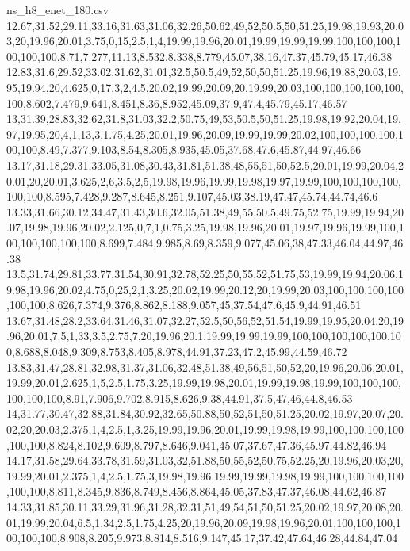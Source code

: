 \begin{filecontents*}[overwrite]{ns_h8_enet_180.csv}
12.67,31.52,29.11,33.16,31.63,31.06,32.26,50.62,49,52,50.5,50,51.25,19.98,19.93,20.03,20,19.96,20.01,3.75,0,15,2.5,1,4,19.99,19.96,20.01,19.99,19.99,19.99,100,100,100,100,100,100,8.71,7.277,11.13,8.532,8.338,8.779,45.07,38.16,47.37,45.79,45.17,46.38
12.83,31.6,29.52,33.02,31.62,31.01,32.5,50.5,49,52,50,50,51.25,19.96,19.88,20.03,19.95,19.94,20,4.625,0,17,3,2,4.5,20.02,19.99,20.09,20,19.99,20.03,100,100,100,100,100,100,8.602,7.479,9.641,8.451,8.36,8.952,45.09,37.9,47.4,45.79,45.17,46.57
13,31.39,28.83,32.62,31.8,31.03,32.2,50.75,49,53,50.5,50,51.25,19.98,19.92,20.04,19.97,19.95,20,4,1,13,3,1.75,4.25,20.01,19.96,20.09,19.99,19.99,20.02,100,100,100,100,100,100,8.49,7.377,9.103,8.54,8.305,8.935,45.05,37.68,47.6,45.87,44.97,46.66
13.17,31.18,29.31,33.05,31.08,30.43,31.81,51.38,48,55,51,50,52.5,20.01,19.99,20.04,20.01,20,20.01,3.625,2,6,3.5,2,5,19.98,19.96,19.99,19.98,19.97,19.99,100,100,100,100,100,100,8.595,7.428,9.287,8.645,8.251,9.107,45.03,38.19,47.47,45.74,44.74,46.6
13.33,31.66,30.12,34.47,31.43,30.6,32.05,51.38,49,55,50.5,49.75,52.75,19.99,19.94,20.07,19.98,19.96,20.02,2.125,0,7,1,0.75,3.25,19.98,19.96,20.01,19.97,19.96,19.99,100,100,100,100,100,100,8.699,7.484,9.985,8.69,8.359,9.077,45.06,38,47.33,46.04,44.97,46.38
13.5,31.74,29.81,33.77,31.54,30.91,32.78,52.25,50,55,52,51.75,53,19.99,19.94,20.06,19.98,19.96,20.02,4.75,0,25,2,1,3.25,20.02,19.99,20.12,20,19.99,20.03,100,100,100,100,100,100,8.626,7.374,9.376,8.862,8.188,9.057,45,37.54,47.6,45.9,44.91,46.51
13.67,31.48,28.2,33.64,31.46,31.07,32.27,52.5,50,56,52,51,54,19.99,19.95,20.04,20,19.96,20.01,7.5,1,33,3.5,2.75,7,20,19.96,20.1,19.99,19.99,19.99,100,100,100,100,100,100,8.688,8.048,9.309,8.753,8.405,8.978,44.91,37.23,47.2,45.99,44.59,46.72
13.83,31.47,28.81,32.98,31.37,31.06,32.48,51.38,49,56,51,50,52,20,19.96,20.06,20.01,19.99,20.01,2.625,1,5,2.5,1.75,3.25,19.99,19.98,20.01,19.99,19.98,19.99,100,100,100,100,100,100,8.91,7.906,9.702,8.915,8.626,9.38,44.91,37.5,47,46,44.8,46.53
14,31.77,30.47,32.88,31.84,30.92,32.65,50.88,50,52,51,50,51.25,20.02,19.97,20.07,20.02,20,20.03,2.375,1,4,2.5,1,3.25,19.99,19.96,20.01,19.99,19.98,19.99,100,100,100,100,100,100,8.824,8.102,9.609,8.797,8.646,9.041,45.07,37.67,47.36,45.97,44.82,46.94
14.17,31.58,29.64,33.78,31.59,31.03,32,51.88,50,55,52,50.75,52.25,20,19.96,20.03,20,19.99,20.01,2.375,1,4,2.5,1.75,3,19.98,19.96,19.99,19.99,19.98,19.99,100,100,100,100,100,100,8.811,8.345,9.836,8.749,8.456,8.864,45.05,37.83,47.37,46.08,44.62,46.87
14.33,31.85,30.11,33.29,31.96,31.28,32.31,51,49,54,51,50,51.25,20.02,19.97,20.08,20.01,19.99,20.04,6.5,1,34,2.5,1.75,4.25,20,19.96,20.09,19.98,19.96,20.01,100,100,100,100,100,100,8.908,8.205,9.973,8.814,8.516,9.147,45.17,37.42,47.64,46.28,44.84,47.04

\end{filecontents*}
